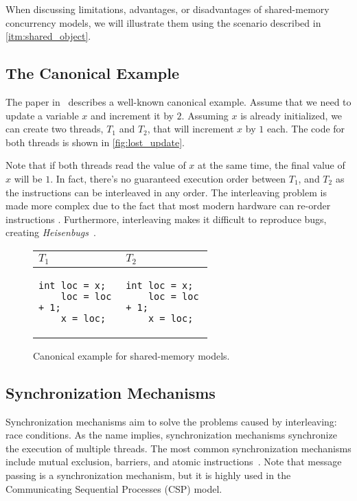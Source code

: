 When discussing limitations, advantages, or disadvantages of shared-memory concurrency models,
we will illustrate them using the scenario described in \autoref{itm:shared_object}.

\subsection{The Canonical Example}

The paper in~\cite{jaffe2011impactOfMemoryModels} describes a well-known canonical example.
Assume that we need to update a variable $x$ and increment it by $2$.
Assuming $x$ is already initialized, we can create two threads, $T_1$ and $T_2$, that will
increment $x$ by $1$ each. The code for both threads is shown in \autoref{fig:lost_update}.

Note that if both threads read the value of $x$ at the same time,
the final value of $x$ will be $1$. In fact, there's no guaranteed execution
order between $T_1$, and $T_2$ as the instructions can be interleaved
in any order. The interleaving problem is made more complex
due to the fact that most modern hardware can re-order instructions
\cite{huang2016debuggingConcurrentPrograms}. Furthermore, interleaving
makes it difficult to reproduce bugs, creating \textit{Heisenbugs}~\cite{rookout2021heisenbug,
gray1986whyComputersStop}.

\begin{figure}[!htp]
    \centering
    \begin{tabular}{|p{0.3\linewidth}|p{0.3\linewidth}|}
        \hline
        \textbf{$T_1$} & \textbf{$T_2$} \\
        \hline
        \begin{Verbatim}[fontsize=\small]
    int loc = x;
    loc = loc + 1;
    x = loc;
        \end{Verbatim}
        &
        \begin{Verbatim}[fontsize=\small]
    int loc = x;
    loc = loc + 1;
    x = loc;
        \end{Verbatim}
        \\
        \hline
    \end{tabular}
    \caption{Canonical example for shared-memory models.}
    \label{fig:lost_update}
\end{figure}

\subsection{Synchronization Mechanisms}
Synchronization mechanisms aim to solve the problems caused by interleaving: race conditions.
As the name implies, synchronization mechanisms synchronize the execution of multiple threads.
The most common synchronization mechanisms include mutual exclusion, barriers,
and atomic instructions~\cite{leroy2021sharedMemorySlides}. Note that message passing is a synchronization
mechanism, but it is highly used in the Communicating Sequential Processes (CSP) model.

